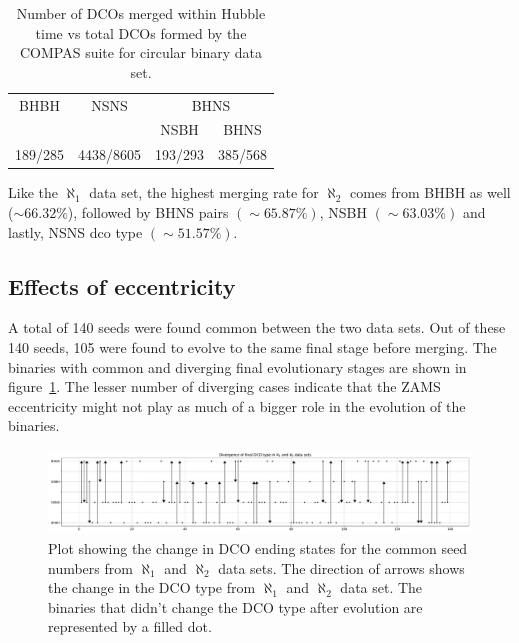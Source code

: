 \documentclass[journal, twocolumn]{IEEEtran}
\begin{document}
    \begin{table}[!h]%
		\centering
		\begin{tabular}{@{}cccc@{}}
			\toprule
			\multirow{2.5}{*}{BHBH} & \multirow{2.5}{*}{NSNS} & \multicolumn{2}{c}{BHNS} \\ \cmidrule(l){3-4}
			&           & NSBH    & BHNS     \\ \midrule
			189/285 & 4438/8605 & 193/293 & 385/568 \\ \bottomrule
		\end{tabular}%
		\caption{Number of DCOs merged within Hubble time vs total DCOs formed by the COMPAS suite for circular binary data set.}
		\label{tab:dco_details0e}
	\end{table}%
	Like the $\aleph_1$ data set, the highest merging rate for $\aleph_2$ comes from BHBH as well ($\sim66.32\%$), followed by BHNS pairs $(\sim65.87\%)$, NSBH $(\sim63.03\%)$ and lastly, NSNS dco type $(\sim51.57\%)$.

	\subsection{Effects of eccentricity}
    \label{subsec:effects-of-eccentricity}
    A total of 140 seeds were found common between the two data sets.
    Out of these 140 seeds, 105 were found to evolve to the same final stage before merging.
    The binaries with common and diverging final evolutionary stages are shown in figure~\ref{fig:dcotypedivergenceintwodatasets}.
    The lesser number of diverging cases indicate that the ZAMS eccentricity might not play as much of a bigger role in the evolution of the binaries.
    
    \begin{figure}[!h]%
    	\centering
    	\includegraphics[width=\textwidth]{analysis_data/dcotype_divergence_in_two_datasets}
    	\caption{Plot showing the change in DCO ending states for the common seed numbers from $\aleph_1$ and $\aleph_2$ data sets. The direction of arrows shows the change in the DCO type from $\aleph_1$ and $\aleph_2$ data set. The binaries that didn't change the DCO type after evolution are represented by a filled dot.}
    	\label{fig:dcotypedivergenceintwodatasets}
    \end{figure}%
    
\end{document}
